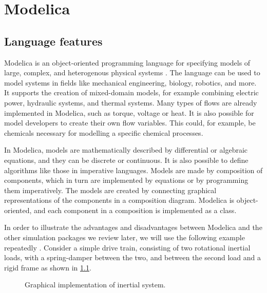 \documentclass[\rootfolder/main.tex]{subfiles}
\begin{document}
\chapter{Modelica} %

\label{Chapter02} %

\section{Language features}

Modelica is an object-oriented programming language for specifying models of large, complex, and heterogenous physical systems \cite{clauss2002}.
The language can be used to model systems in fields like mechanical engineering, biology, robotics, and more.
It supports the creation of mixed-domain models, for example combining electric power, hydraulic systems, and thermal systems.
Many types of flows are already implemented in Modelica, such as torque, voltage or heat.
It is also possible for model developers to create their own flow variables.
This could, for example, be chemicals necessary for modelling a specific chemical processes.

In Modelica, models are mathematically described by differential or algebraic equations, and they can be discrete or continuous.
It is also possible to define algorithms like those in imperative languages.
Models are made by composition of components, which in turn are implemented by equations or by programming them imperatively.
The models are created by connecting graphical representations of the components in a composition diagram.
Modelica is object-oriented, and each component in a composition is implemented as a class.

In order to illustrate the advantages and disadvantages between Modelica and the other simulation packages we review later, we will use the following example repeatedly \footnotemark.
Consider a simple drive train, consisting of two rotational inertial loads, with a spring-damper between the two, and between the second load and a rigid frame as shown in \cref{fig:inertial}.


\begin{figure}[ht]
    \caption{Graphical implementation of inertial system.\label{fig:inertial}}
\end{figure}
\end{document}

